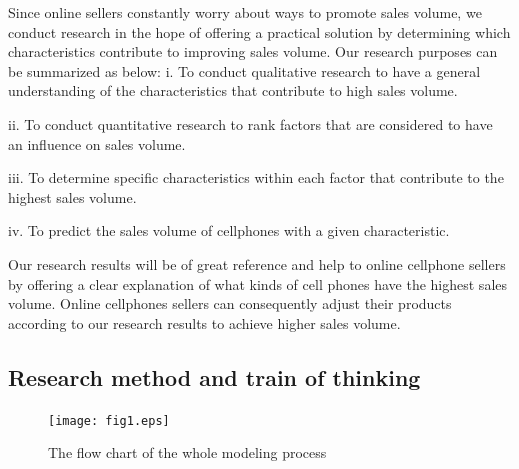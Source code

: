 Since online sellers constantly worry about ways to promote sales volume, we conduct research in the hope of offering a practical solution by determining which characteristics contribute to improving sales volume. Our research purposes can be summarized as below:
i. To conduct qualitative research to have a general understanding of the characteristics that contribute to high sales volume. 

ii. To conduct quantitative research to rank factors that are considered to have an influence on sales volume.

iii. To determine specific characteristics within each factor that contribute to the highest sales volume.

iv. To predict the sales volume of cellphones with a given characteristic. 

Our research results will be of great reference and help to online cellphone sellers by offering a clear explanation of what kinds of cell phones have the highest sales volume. Online cellphones sellers can consequently adjust their products according to our research results to achieve higher sales volume.

\subsection{Research method and train of thinking}
\begin{figure}[!ht]
	\centering
	\texttt{[image: fig1.eps]}
	\caption{The flow chart of the whole modeling process}
	\label{fig1}
\end{figure}

